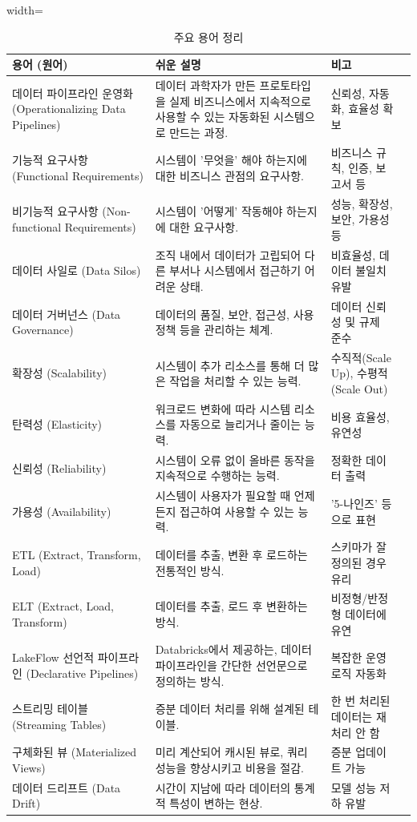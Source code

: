\documentclass[11pt,a4paper]{article}
\begin{document}
\begin{table}[h!]
\centering
\caption{주요 용어 정리}
\label{tab:glossary}
\begin{adjustbox}{width=\textwidth}
\begin{tabular}{lllc}
\toprule
\textbf{용어 (원어)} & \textbf{쉬운 설명} & \textbf{비고} \\
\midrule
데이터 파이프라인 운영화 (Operationalizing Data Pipelines) & 데이터 과학자가 만든 프로토타입을 실제 비즈니스에서 지속적으로 사용할 수 있는 자동화된 시스템으로 만드는 과정. & 신뢰성, 자동화, 효율성 확보 \\
기능적 요구사항 (Functional Requirements) & 시스템이 '무엇을' 해야 하는지에 대한 비즈니스 관점의 요구사항. & 비즈니스 규칙, 인증, 보고서 등 \\
비기능적 요구사항 (Non-functional Requirements) & 시스템이 '어떻게' 작동해야 하는지에 대한 요구사항. & 성능, 확장성, 보안, 가용성 등 \\
데이터 사일로 (Data Silos) & 조직 내에서 데이터가 고립되어 다른 부서나 시스템에서 접근하기 어려운 상태. & 비효율성, 데이터 불일치 유발 \\
데이터 거버넌스 (Data Governance) & 데이터의 품질, 보안, 접근성, 사용 정책 등을 관리하는 체계. & 데이터 신뢰성 및 규제 준수 \\
확장성 (Scalability) & 시스템이 추가 리소스를 통해 더 많은 작업을 처리할 수 있는 능력. & 수직적(Scale Up), 수평적(Scale Out) \\
탄력성 (Elasticity) & 워크로드 변화에 따라 시스템 리소스를 자동으로 늘리거나 줄이는 능력. & 비용 효율성, 유연성 \\
신뢰성 (Reliability) & 시스템이 오류 없이 올바른 동작을 지속적으로 수행하는 능력. & 정확한 데이터 출력 \\
가용성 (Availability) & 시스템이 사용자가 필요할 때 언제든지 접근하여 사용할 수 있는 능력. & '5-나인즈' 등으로 표현 \\
ETL (Extract, Transform, Load) & 데이터를 추출, 변환 후 로드하는 전통적인 방식. & 스키마가 잘 정의된 경우 유리 \\
ELT (Extract, Load, Transform) & 데이터를 추출, 로드 후 변환하는 방식. & 비정형/반정형 데이터에 유연 \\
LakeFlow 선언적 파이프라인 (Declarative Pipelines) & Databricks에서 제공하는, 데이터 파이프라인을 간단한 선언문으로 정의하는 방식. & 복잡한 운영 로직 자동화 \\
스트리밍 테이블 (Streaming Tables) & 증분 데이터 처리를 위해 설계된 테이블. & 한 번 처리된 데이터는 재처리 안 함 \\
구체화된 뷰 (Materialized Views) & 미리 계산되어 캐시된 뷰로, 쿼리 성능을 향상시키고 비용을 절감. & 증분 업데이트 가능 \\
데이터 드리프트 (Data Drift) & 시간이 지남에 따라 데이터의 통계적 특성이 변하는 현상. & 모델 성능 저하 유발 \\
\bottomrule
\end{tabular}
\end{adjustbox}
\end{table}
\end{document}

